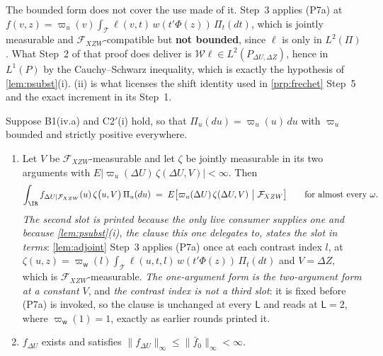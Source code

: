 \begin{remark}\label{rem:psubstscope}
The bounded form does not cover the use made of it.  Step~3 applies
\textup{(P7a)} at
$f(v,z)=\varpi_u(v)\int_{\mathcal T}\ell(v,t)\,w(t'\Phi(z))\,\Pi_t(dt)$, which is jointly measurable and
$\mathcal F_{XZW}$-compatible but \textbf{not bounded}, since $\ell$ is only in $L^{2}(\Pi)$. What Step~2
of that proof does deliver is $\mathcal W\ell\in L^{2}(P_{\Delta U,\Delta Z})$, hence in $L^{1}(P)$ by the
Cauchy--Schwarz inequality, which is exactly the hypothesis of \cref{lem:psubst}(i).
(ii) is what licenses the shift identity used in \cref{prp:frechet} Step~5 and the
exact increment in its Step~1.
\end{remark}

\begin{lemma}\label{lem:pdens}
Suppose B1(iv.a) and C2$'$(i) hold, so that $\Pi_u(du)=\varpi_u(u)\,du$ with $\varpi_u$ bounded and
strictly positive everywhere.
\begin{enumerate}
\item[\textup{(P7a)}] Let $V$ be $\mathcal F_{XZW}$-measurable and let $\zeta$ be jointly measurable in its
two arguments with $E\big|\varpi_u(\Delta U)\,\zeta(\Delta U,V)\big|<\infty$. Then
\[
\int_{\IR}f_{\Delta U\mid\mathcal F_{XZW}}(u)\,\zeta\big(u,V\big)\,\Pi_u(du)
\;=\;E\big[\varpi_u(\Delta U)\,\zeta(\Delta U,V)\ \big|\ \mathcal F_{XZW}\big]
\qquad\text{for almost every }\omega .
\]
\emph{The second slot is printed because the only live consumer supplies one and because
\cref{lem:psubst}(i), the clause this one delegates to, states the slot in terms}: \cref{lem:adjoint}
Step~3 applies (P7a) once at each contrast index $l$, at
$\zeta(u,z)=\varpi_{\mathsf w}(l)\int_{\mathcal T}\ell(u,t,l)\,w(t'\Phi(z))\,\Pi_t(dt)$ and
$V=\Delta Z$, which is $\mathcal F_{XZW}$-measurable. \emph{The one-argument form is the two-argument
form at a constant $V$}, and \emph{the contrast index is not a third slot}: it is fixed before (P7a) is
invoked, so the clause is unchanged at every $\mathsf L$ and reads at $\mathsf L=2$, where
$\varpi_{\mathsf w}(1)=1$, exactly as earlier rounds printed it.
\item[\textup{(P7b)}] $f_{\Delta U}$ exists and satisfies
$\|f_{\Delta U}\|_\infty\le\|\bar f_0\|_\infty<\infty$.
\end{enumerate}
\end{lemma}

